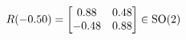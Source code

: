 \documentclass[preview]{standalone}
\begin{document}
\begin{align*}
\special{dvisvgm:raw <g id='unique000'>}R(-0.50) = \begin{bmatrix} 0.88 & 0.48 \\ -0.48 & 0.88 \end{bmatrix} \in \text{SO}(2)\special{dvisvgm:raw </g>}
\end{align*}
\end{document}
